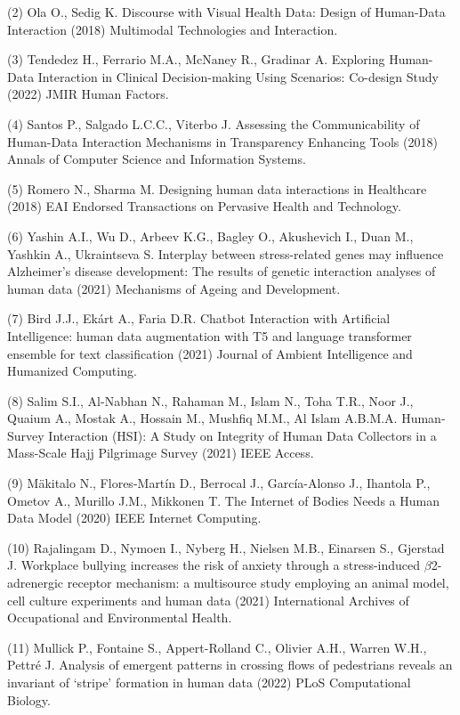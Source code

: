 \documentclass[
	12pt,				%
	oneside,			%
	a4paper,			%
	english,			%
	brazil				%
	]{abntex2ppgsi}
\begin{document}
\begin{apendicesenv}
(2) Ola O., Sedig K. Discourse with Visual Health Data: Design of Human-Data Interaction (2018) Multimodal Technologies and Interaction.

(3) Tendedez H., Ferrario M.A., McNaney R., Gradinar A. Exploring Human-Data Interaction in Clinical Decision-making Using Scenarios: Co-design Study (2022) JMIR Human Factors.

(4) Santos P., Salgado L.C.C., Viterbo J. Assessing the Communicability of Human-Data Interaction Mechanisms in Transparency Enhancing Tools (2018) Annals of Computer Science and Information Systems.

(5) Romero N., Sharma M. Designing human data interactions in Healthcare (2018) EAI Endorsed Transactions on Pervasive Health and Technology.

(6) Yashin A.I., Wu D., Arbeev K.G., Bagley O., Akushevich I., Duan M., Yashkin A., Ukraintseva S. Interplay between stress-related genes may influence Alzheimer’s disease development: The results of genetic interaction analyses of human data (2021) Mechanisms of Ageing and Development.

(7) Bird J.J., Ekárt A., Faria D.R. Chatbot Interaction with Artificial Intelligence: human data augmentation with T5 and language transformer ensemble for text classification (2021) Journal of Ambient Intelligence and Humanized Computing.

(8) Salim S.I., Al-Nabhan N., Rahaman M., Islam N., Toha T.R., Noor J., Quaium A., Mostak A., Hossain M., Mushfiq M.M., Al Islam A.B.M.A. Human-Survey Interaction (HSI): A Study on Integrity of Human Data Collectors in a Mass-Scale Hajj Pilgrimage Survey (2021) IEEE Access.

(9) Mäkitalo N., Flores-Martín D., Berrocal J., García-Alonso J., Ihantola P., Ometov A., Murillo J.M., Mikkonen T. The Internet of Bodies Needs a Human Data Model (2020) IEEE Internet Computing.

(10) Rajalingam D., Nymoen I., Nyberg H., Nielsen M.B., Einarsen S., Gjerstad J. Workplace bullying increases the risk of anxiety through a stress-induced $\beta$2-adrenergic receptor mechanism: a multisource study employing an animal model, cell culture experiments and human data (2021) International Archives of Occupational and Environmental Health.

(11) Mullick P., Fontaine S., Appert-Rolland C., Olivier A.H., Warren W.H., Pettré J. Analysis of emergent patterns in crossing flows of pedestrians reveals an invariant of ‘stripe’ formation in human data (2022) PLoS Computational Biology.


\end{apendicesenv}
\end{document}

